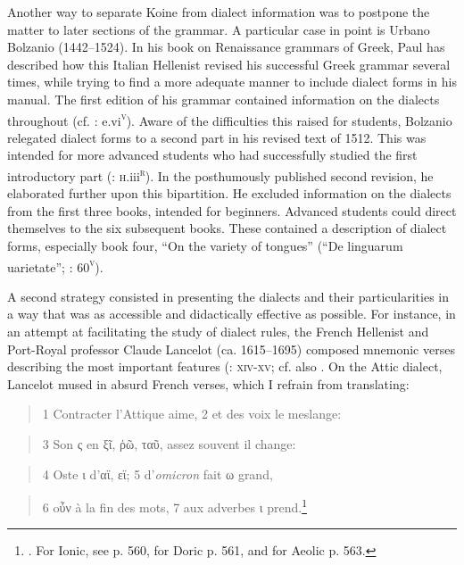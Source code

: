 Another way to separate Koine from dialect information was to postpone the matter to later sections of the grammar. A particular case in point is Urbano Bolzanio (1442–1524). In his book on Renaissance grammars of Greek, Paul \citet[36--40]{Botley2010} has described how this Italian Hellenist revised his successful Greek grammar several times, while trying to find a more adequate manner to include dialect forms in his manual. The first edition of his grammar contained information on the dialects throughout (cf. \citealt{Bolzanio1497}: e.vi\textsc{\textsuperscript{v}}). Aware of the difficulties this raised for students, Bolzanio relegated dialect forms to a second part in his revised text of 1512. This was intended for more advanced students who had successfully studied the first introductory part (\citealt{Bolzanio1512}: \textsc{h}.iii\textsc{\textsuperscript{r}}). In the posthumously published second revision, he elaborated further upon this bipartition. He excluded information on the dialects from the first three books, intended for beginners. Advanced students could direct themselves to the six subsequent books. These contained a description of dialect forms, especially book four, “On the variety of tongues” (“De linguarum uarietate”; \citealt{Bolzanio1545}: 60\textsc{\textsuperscript{v}}).

A second strategy consisted in presenting the dialects and their particularities in a way that was as accessible and didactically effective as possible. For instance, in an attempt at facilitating the study of dialect rules, the French Hellenist and Port-Royal professor Claude Lancelot (ca. 1615–1695) composed mnemonic verses describing the most important features (\citealt{Lancelot1655}: \textsc{xiv-xv;} cf. also \citet[]{Anon.1725}. On the Attic dialect, Lancelot mused in absurd French verses, which I refrain from translating:

\begin{quote}
1 Contracter l’Attique aime, 2 et des voix le meslange:
\end{quote}

\begin{quote}
3 Son ς en ξῖ, ῥῶ, ταῦ, assez souvent il change:
\end{quote}

\begin{quote}
4 Oste ι d’αϊ, εϊ; 5 d’\textit{omicron} fait ω grand,
\end{quote}

\begin{quote}
6 oὖν à la fin des mots, 7 aux adverbes ι prend.\footnote{\citet[558]{Lancelot1655}. For Ionic, see p. 560, for Doric p. 561, and for Aeolic p. 563.}
\end{quote}

